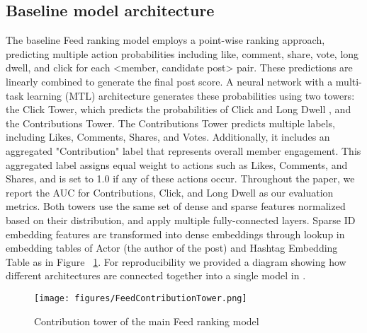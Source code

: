 \subsection{Baseline model architecture}\label{sec:Overview:FeedRanking}
The baseline Feed ranking model \cite{LiRank_paper} employs a point-wise ranking approach, predicting multiple action probabilities including like, comment, share, vote, long dwell, and click for each <member, candidate post> pair. These predictions are linearly combined to generate the final post score. A neural network with a multi-task learning (MTL) architecture generates these probabilities using two towers: the Click Tower, which predicts the probabilities of Click and Long Dwell \cite{dwell_linkedin}, and the Contributions Tower. The Contributions Tower predicts multiple labels, including Likes, Comments, Shares, and Votes. Additionally, it includes an aggregated "Contribution" label that represents overall member engagement. This aggregated label assigns equal weight to actions such as Likes, Comments, and Shares, and is set to 1.0 if any of these actions occur. Throughout the paper, we report the AUC for Contributions, Click, and Long Dwell as our evaluation metrics. Both towers use the same set of dense and sparse features normalized based on their distribution\cite{AirBnB_Search}, and apply multiple fully-connected layers. Sparse ID embedding features \cite{LiRank_paper} are transformed into dense embeddings \cite{DLRM19} through lookup in embedding tables of Actor (the author of the post) and Hashtag Embedding Table as in Figure ~\ref{fig:FeedContributionTower}. For reproducibility we provided a diagram showing how different architectures are connected together into a single model in \cite{LiRank_paper}.

\begin{figure}
  \centering
  \texttt{[image: figures/FeedContributionTower.png]}
  \caption{Contribution tower of the main Feed ranking model}
  \label{fig:FeedContributionTower}
\end{figure}